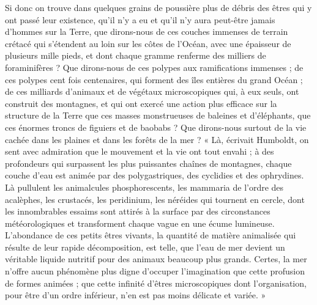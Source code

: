 \documentclass[a4paper, 11pt, oneside, landscape]{article}
\begin{document}
Si donc on trouve dans quelques grains de poussière plus de débris des êtres qui y ont passé leur existence, qu'il n'y a eu et qu'il n'y aura peut-être jamais d'hommes sur la Terre, que dirons-nous de ces couches immenses de terrain crétacé qui s'étendent au loin sur les côtes de l'Océan, avec une épaisseur de plusieurs mille pieds, et dont chaque gramme renferme des milliers de foraminifères ? Que dirons-nous de ces polypes aux ramifications immenses ; de ces polypes cent fois centenaires, qui forment des îles entières du grand Océan ; de ces milliards d'animaux et de végétaux microscopiques qui, à eux seuls, ont construit des montagnes, et qui ont exercé une action plus efficace sur la structure de la Terre que ces masses monstrueuses de baleines et d'éléphants, que ces énormes troncs de figuiers et de baobabs ? Que dirons-nous surtout de la vie cachée dans les plaines et dans les forêts de la mer ? « Là, écrivait Humboldt, on sent avec admiration que le mouvement et la vie ont tout envahi ; à des profondeurs qui surpassent les plus puissantes chaînes de montagnes, chaque couche d'eau est animée par des polygastriques, des cyclidies et des ophrydines. Là pullulent les animalcules phosphorescents, les mammaria de l'ordre des acalèphes, les crustacés, les peridinium, les néréides qui tournent en cercle, dont les innombrables essaims sont attirés à la surface par des circonstances météorologiques et transforment chaque vague en une écume lumineuse. L'abondance de ces petits êtres vivants, la quantité de matière animalisée qui résulte de leur rapide décomposition, est telle, que l'eau de mer devient un véritable liquide nutritif pour des animaux beaucoup plus grands. Certes, la mer n'offre aucun phénomène plus digne d'occuper l'imagination que cette profusion de formes animées ; que cette infinité d'êtres microscopiques dont l'organisation, pour être d'un ordre inférieur, n'en est pas moins délicate et variée. »
\end{document}

